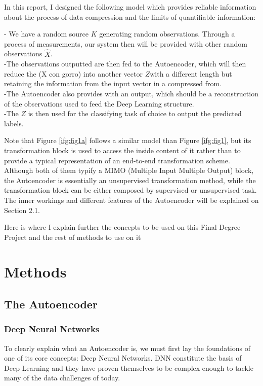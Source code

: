 \documentclass[12pt]{report}
\begin{document}
In this report, I designed the following model which provides reliable information about the process of data compression and the limits of quantifiable information: \par

- We have a random source $K$ generating random observations. Through a process of measurements, our system then will be provided with other random observations $\hat{X}$. \\
-The observations outputted are then fed to the Autoencoder, which will then reduce the (X con gorro) into another vector $Z$with a different length but retaining the information from the input vector in a compressed from. \\
-The Autoencoder also provides with an output, which should be a reconstruction of the observations used to feed the Deep Learning structure. \\
-The $Z$ is then used for the classifying task of choice to output the predicted labels. \par

Note that Figure \ref{ifg:fig1a} follows a similar model than Figure \ref{ifg:fig1}, but its transformation block is used to access the inside content of it rather than to provide a typical representation of an end-to-end transformation scheme. Although both of them typify a MIMO (Multiple Input Multiple Output) block, the Autoencoder is essentially an unsupervised transformation method, while the transformation block can be either composed by supervised or unsupervised task. The inner workings and different features of the Autoencoder will be explained on Section 2.1. \par

Here is where I explain further the concepts to be used on this Final Degree Project and the rest of methods to use on it \par

\chapter{Methods}
\section{The Autoencoder}
\subsection{Deep Neural Networks}

To clearly explain what an Autoencoder is, we must first lay the foundations of one of its core concepts: Deep Neural Networks. DNN constitute the basis of Deep Learning and they have proven themselves to be complex enough to tackle many of the data challenges of today. \par
\end{document}
